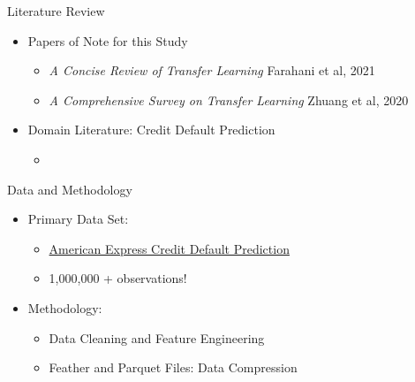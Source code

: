 \documentclass{beamer}
\begin{document}
\begin{frame}{Literature Review}

  \begin{itemize}
    \item Papers of Note for this Study 
      \begin{itemize}
        \item \textit{A Concise Review of Transfer Learning} Farahani et al, 2021 
        \item \textit{A Comprehensive Survey on Transfer Learning} Zhuang et al, 2020   
      \end{itemize}
    \item Domain Literature: Credit Default Prediction 
      \begin{itemize}
        \item {}
      \end{itemize}
  \end{itemize}

\end{frame} 

\begin{frame}{Data and Methodology}

  \begin{itemize}
    \item Primary Data Set:
      \begin{itemize}
        \item \href{https://www.kaggle.com/competitions/amex-default-prediction/overview}{American Express Credit Default Prediction}
        \item 1,000,000 + observations! 
      \end{itemize}
    \item Methodology: 
      \begin{itemize}
        \item Data Cleaning and Feature Engineering 
        \item Feather and Parquet Files: Data Compression 
      \end{itemize}
  \end{itemize}

\end{frame}
\end{document}
